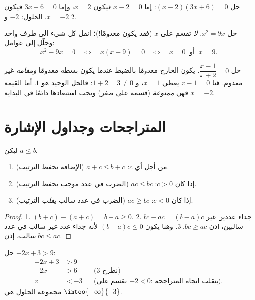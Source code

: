\begin{example}\label{ex:g10:algebra:zeroproduct}
حل $(x - 2)(3x + 6) = 0$: إما $x - 2 = 0$ فيكون $x = 2$، وإما
$3x + 6 = 0$ فيكون $x = -2$. الحلول: $-2$ و $2$.

حل $x^2 = 9x$. \emph{لا} تقسم على $x$ (فقد يكون معدومًا!)؛ انقل
كل شيء إلى طرف واحد وحلّل إلى عوامل:
\[
x^2 - 9x = 0
\quad\Longleftrightarrow\quad
x(x - 9) = 0
\quad\Longleftrightarrow\quad
x = 0 \ \text{ أو } \ x = 9 .
\]
\end{example}

\begin{example}\label{ex:g10:algebra:quotient}
حل $\dfrac{x - 1}{x + 2} = 0$. يكون الخارج معدومًا بالضبط عندما يكون
بسطه معدومًا \emph{ومقامه} غير معدوم. هنا $x - 1 = 0$
يعطي $x = 1$، و $1 + 2 = 3 \neq 0$: فالحل الوحيد هو $1$. أما القيمة
$x = -2$ فهي \emph{ممنوعة} (قسمة على صفر) ويجب استبعادها
دائمًا في البداية.
\end{example}

\section{المتراجحات وجداول الإشارة}

\begin{proposition}\label{prop:g10:algebra:ineqrules}
ليكن $a \leq b$.
\begin{enumerate}
  \item من أجل أي $c$: $a + c \leq b + c$ (الإضافة تحفظ الترتيب).
  \item إذا كان $c > 0$: $ac \leq bc$ (الضرب في عدد موجب
        يحفظ الترتيب).
  \item إذا كان $c < 0$: $ac \geq bc$ (الضرب في عدد سالب
        \emph{يقلب} الترتيب).
\end{enumerate}
\end{proposition}

\begin{proof}
1. $(b + c) - (a + c) = b - a \geq 0$.
2. $bc - ac = (b-a)c$ جداء عددين غير سالبين، إذن
$bc \geq ac$.
3. وهنا يكون $(b-a)c \leq 0$ لأنه جداء عدد غير سالب في عدد
سالب، إذن $bc \leq ac$.
\end{proof}

\begin{example}\label{ex:g10:algebra:firstineq}
حل $-2x + 3 > 9$:
\begin{align*}
-2x + 3 &> 9 \\
-2x &> 6 && \text{(نطرح 3)} \\
x &< -3 && \text{(نقسم على $-2 < 0$: ينقلب اتجاه المتراجحة).}
\end{align*}
مجموعة الحلول هي $\intoo{-\infty}{-3}$.
\end{example}

